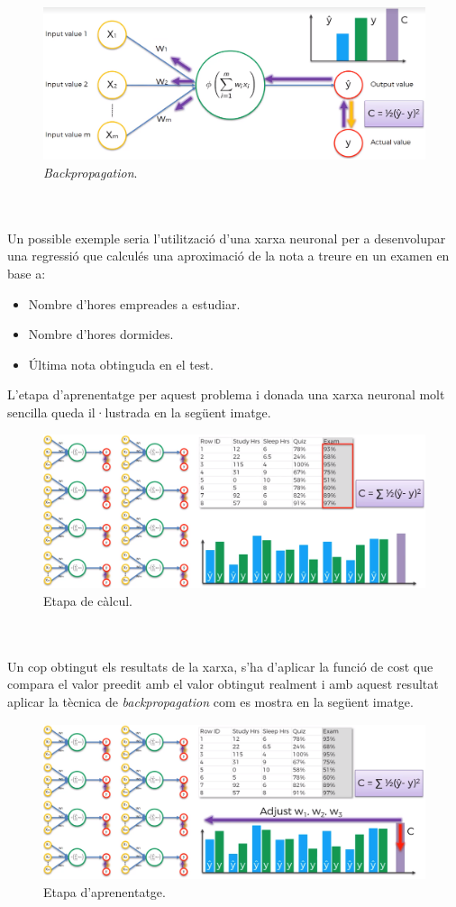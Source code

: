 \documentclass[12pt]{article}
\begin{document}
\begin{figure}[h!]
	\centering
	\includegraphics[scale=0.3]{imatges/aprendre/2bp.png}
	\caption{\textit{Backpropagation}.}
\end{figure}
\\\\Un possible exemple seria l'utilització d'una xarxa neuronal per a desenvolupar una regressió que calculés una aproximació de la nota a treure en un examen en base a:
\begin{itemize}
	\item Nombre d'hores empreades a estudiar.
	\item Nombre d'hores dormides.
	\item Última nota obtinguda en el test.
\end{itemize}
L'etapa d'aprenentatge per aquest problema i donada una xarxa neuronal molt sencilla queda il·lustrada en la següent imatge.
\begin{figure}[h!]
	\centering
	\includegraphics[scale=0.3]{imatges/aprendre/3aprendre.png}
	\caption{Etapa de càlcul.}
	\label{fig:3aprendre}
\end{figure}
\\\\Un cop obtingut els resultats de la xarxa, s'ha d'aplicar la funció de cost que compara el valor preedit amb el valor obtingut realment i amb aquest resultat aplicar la tècnica de \textit{backpropagation} com es mostra en la següent imatge.
\begin{figure}[h!]
	\centering
	\includegraphics[scale=0.3]{imatges/aprendre/4bp.png}
	\caption{Etapa d'aprenentatge.}
	\label{fig:4bp}
\end{figure}
\end{document}
